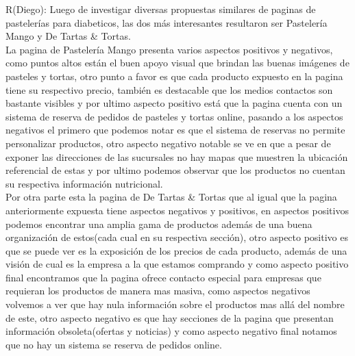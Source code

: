 \documentclass[preprintnumbers,superscriptaddress,amsmath,%
  amssymb,aps,reprint,nofootinbib]{revtex4-1}
\numberwithin{equation}{section}
\begin{document}
R(Diego): Luego de investigar diversas propuestas similares de paginas de pastelerías para diabeticos, las dos más interesantes resultaron ser Pastelería Mango y De Tartas & Tortas. \\
La pagina de Pastelería Mango presenta varios aspectos positivos y negativos, como puntos altos están el buen apoyo visual que brindan las buenas imágenes de pasteles y tortas, otro punto a favor es que cada producto expuesto en la pagina tiene su respectivo precio, también es destacable que los medios contactos son bastante visibles y por ultimo aspecto positivo está que la pagina cuenta con un sistema de reserva de pedidos de pasteles y tortas online, pasando a los aspectos negativos el primero que podemos notar es que el sistema de reservas no permite personalizar productos, otro aspecto negativo notable se ve en que a pesar de exponer las direcciones de las sucursales no hay mapas que muestren la ubicación referencial de estas y por ultimo podemos observar que los productos no cuentan su respectiva información nutricional.\\
Por otra parte esta la pagina de De Tartas & Tortas que al igual que la pagina anteriormente expuesta tiene aspectos negativos y positivos, en aspectos positivos podemos encontrar una amplia gama de productos además de una buena organización de estos(cada cual en su respectiva sección), otro aspecto positivo es que se puede ver es la exposición de los precios de cada producto, además de una visión de cual es la empresa a la que estamos comprando y como aspecto positivo final encontramos que la pagina ofrece contacto especial para empresas que requieran los productos de manera mas masiva, como aspectos negativos volvemos a ver que hay nula información sobre el productos mas allá del nombre de este, otro aspecto negativo es que hay secciones de la pagina que presentan información obsoleta(ofertas y noticias) y como aspecto negativo final notamos que no hay un sistema se reserva de pedidos online.\\
\\
\end{document}
